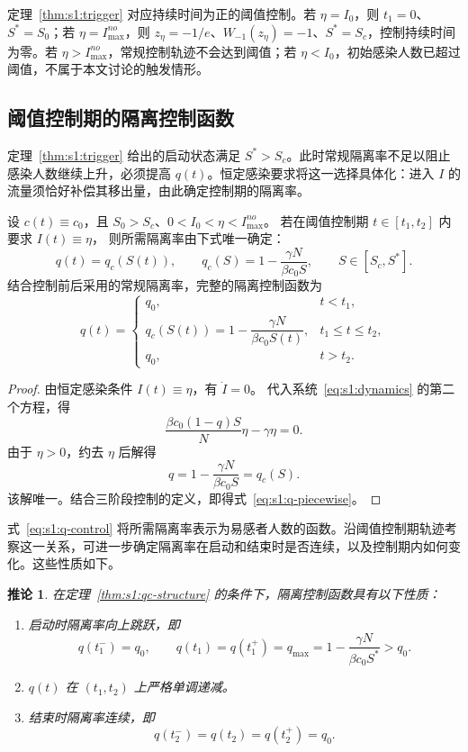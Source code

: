 \documentclass[lang=cn,a4paper,newtx]{elegantpaper}
\numberwithin{equation}{section}
\theoremstyle{plain}
\newtheorem{corollaryn}[theorem]{推论}
\begin{document}
\begin{remark}
定理~\ref{thm:s1:trigger} 对应持续时间为正的阈值控制。若 $\eta=I_0$，则 $t_1=0$、$S^*=S_0$；若 $\eta=I_{\max}^{no}$，则 $z_\eta=-1/e$、$W_{-1}(z_\eta)=-1$、$S^*=S_c$，控制持续时间为零。若 $\eta>I_{\max}^{no}$，常规控制轨迹不会达到阈值；若 $\eta<I_0$，初始感染人数已超过阈值，不属于本文讨论的触发情形。
\end{remark}

\subsection{阈值控制期的隔离控制函数}
定理~\ref{thm:s1:trigger} 给出的启动状态满足 $S^*>S_c$。此时常规隔离率不足以阻止感染人数继续上升，必须提高 $q(t)$。恒定感染要求将这一选择具体化：进入 $I$ 的流量须恰好补偿其移出量，由此确定控制期的隔离率。

\begin{theorem}
\label{thm:s1:qc-structure}
设 $c(t)\equiv c_0$，且 $S_0>S_c$、$0<I_0<\eta<I_{\max}^{no}$。
若在阈值控制期 $t\in[t_1,t_2]$ 内要求 $I(t)\equiv\eta$，
则所需隔离率由下式唯一确定：
\begin{equation}
q(t)=q_c(S(t)),\qquad
q_c(S)=1-\frac{\gamma N}{\beta c_0S},\qquad S\in[S_c,S^*].
\label{eq:s1:q-control}
\end{equation}
结合控制前后采用的常规隔离率，完整的隔离控制函数为
\begin{equation}
q(t)=
\begin{cases}
q_0, & t<t_1,\\[0.35em]
q_c(S(t))=1-\dfrac{\gamma N}{\beta c_0S(t)}, & t_1\le t\le t_2,\\[0.7em]
q_0, & t>t_2.
\end{cases}
\label{eq:s1:q-piecewise}
\end{equation}
\end{theorem}

\begin{proof}
由恒定感染条件 $I(t)\equiv\eta$，有 $\dot I=0$。
代入系统~\eqref{eq:s1:dynamics} 的第二个方程，得
\[
\frac{\beta c_0(1-q)S}{N}\eta-\gamma\eta=0.
\]
由于 $\eta>0$，约去 $\eta$ 后解得
\[
q=1-\frac{\gamma N}{\beta c_0S}=q_c(S).
\]
该解唯一。结合三阶段控制的定义，即得式~\eqref{eq:s1:q-piecewise}。
\end{proof}

式~\eqref{eq:s1:q-control} 将所需隔离率表示为易感者人数的函数。沿阈值控制期轨迹考察这一关系，可进一步确定隔离率在启动和结束时是否连续，以及控制期内如何变化。这些性质如下。

\begin{corollaryn}
\label{cor:s1:qc-structure}
在定理~\ref{thm:s1:qc-structure} 的条件下，隔离控制函数具有以下性质：
\begin{enumerate}
\renewcommand{\labelenumi}{(\roman{enumi})}
    \item 启动时隔离率向上跳跃，即
    \[
    q(t_1^-)=q_0,\qquad
    q(t_1)=q(t_1^+)=q_{\max}
    =1-\frac{\gamma N}{\beta c_0S^*}>q_0.
    \]
    \item $q(t)$ 在 $(t_1,t_2)$ 上严格单调递减。
    \item 结束时隔离率连续，即
    \[
    q(t_2^-)=q(t_2)=q(t_2^+)=q_0.
    \]
\end{enumerate}
\end{corollaryn}
\end{document}
